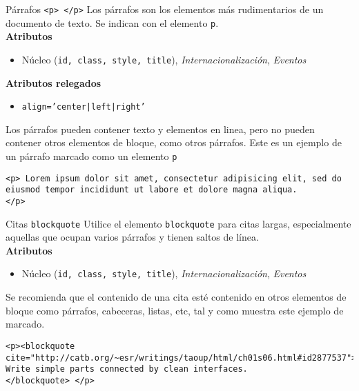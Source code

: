 \begin{frame}[fragile]{Párrafos \texttt{<p> </p>}} %
    Los párrafos son los elementos más rudimentarios de un documento de texto.
    Se indican con el elemento \texttt{p}.\\[0.5cm]

    \textbf{Atributos}
    \begin{itemize}
        \item Núcleo (\texttt{id, class, style, title}),
        \textit{Internacionalización},  \textit{Eventos}
    \end{itemize}
    \textbf{Atributos relegados}
    \begin{itemize}
        \item \texttt{align='center|left|right'}
    \end{itemize}

    Los párrafos pueden contener texto y elementos en linea, pero no pueden
    contener otros elementos de bloque, como otros párrafos. Este es un ejemplo
    de un párrafo marcado como un elemento \texttt{p}

    \begin{lstlisting}
<p> Lorem ipsum dolor sit amet, consectetur adipisicing elit, sed do eiusmod tempor incididunt ut labore et dolore magna aliqua.
</p> 
    \end{lstlisting}

\end{frame}

\begin{frame}[fragile]{Citas \texttt{blockquote}} %
    Utilice el elemento \texttt{blockquote} para citas largas, especialmente
    aquellas que ocupan varios párrafos y tienen saltos de línea. \\[0.5cm]
    \textbf{Atributos}
    \begin{itemize}
        \item Núcleo (\texttt{id, class, style, title}),
        \textit{Internacionalización},  \textit{Eventos}
    \end{itemize}
    Se recomienda que el contenido de una cita esté contenido en otros
    elementos de bloque como párrafos, cabeceras, listas, etc, tal y como
    muestra este ejemplo de marcado. 

    \begin{lstlisting}
<p><blockquote
cite="http://catb.org/~esr/writings/taoup/html/ch01s06.html#id2877537"> 
Write simple parts connected by clean interfaces.
</blockquote> </p>
    \end{lstlisting}
\end{frame}


